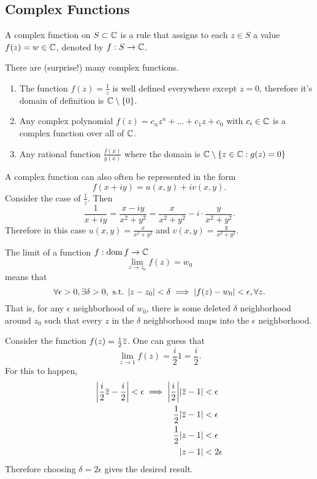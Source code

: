 \documentclass[../notes.tex]{subfiles}
\begin{document}

\subsection{Complex Functions}

\begin{definition}
    A complex function on $S \subset \mathbb{C}$ is a rule that assigns to each $z \in S$ a value $f(z) = w \in \mathbb{C}$, denoted by $f : S \to \mathbb{C}$.
\end{definition}

\begin{example}
    There are (surprise!) many complex functions.
    \begin{enumerate}
        \item The function $f(z) = \frac{1}{z}$ is well defined everywhere except $z = 0$, therefore it's domain of definition is $\mathbb{C} \setminus \qty{0}$.
        \item Any complex polynomial $f(z) = c_n z^n + \ldots + c_1 z + c_0$ with $c_i \in \mathbb{C}$ is a complex function over all of $\C$.
        \item Any rational function $\frac{f(x)}{g(x)}$ where the domain is $\mathbb{C} \setminus \qty{z \in \mathbb{C}: g(z) = 0}$
    \end{enumerate}
\end{example}

A complex function can also often be represented in the form
\[
    f(x+iy) = u(x,y) + i v(x, y)
.\]
Consider the case of $\frac{1}{z}$. Then
\[
    \frac{1}{x+iy} = \frac{x-iy}{x^2+y^2} = \frac{x}{x^2+y^2} - i \cdot \frac{y}{x^2+y^2}
.\]
Therefore in this case $u(x,y) = \frac{x}{x^2+y^2}$ and $v(x,y) = \frac{y}{x^2+y^2}$.

\begin{definition}[Limits in $\C$]
    The limit of a function $f:\operatorname{dom} f \to \mathbb{C}$
    \[
        \lim_{z \to z_0} f(z) = w_0
    \]
    means that 
    \[
        \forall \epsilon > 0, \exists \delta > 0, \text{ s.t. } |z-z_0| < \delta \implies |f(z) - w_0| < \epsilon, \forall z
    .\]
    That is, for any $\epsilon$ neighborhood of $w_0$, there is some deleted $\delta$ neighborhood around $z_0$ such that every $z$ in the $\delta$ neighborhood maps into the $\epsilon$ neighborhood.
\end{definition}

\begin{example}
    Consider the function $f(z) = \frac{i}{2} \overline{z}$. One can guess that
    \[
        \lim_{z \to 1} f(z) = \frac{i}{2} 1 = \frac{i}{2}
    .\]
    For this to happen,
    \begin{align*}
        \qty|\frac{i}{2} \overline{z} - \frac{i}{2}| < \epsilon \implies \qty|\frac{i}{2}| |\overline{z} - 1| &< \epsilon \\
        \frac{1}{2} |\overline{z} - 1| &< \epsilon \\
        \frac{1}{2} |z - 1| &< \epsilon \\
        |z - 1| &< 2 \epsilon
    \end{align*}
    Therefore choosing $\delta = 2 \epsilon$ gives the desired result.
\end{example}
\end{document}
